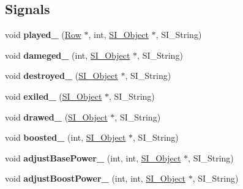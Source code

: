 \subsection*{Signals}
\begin{DoxyCompactItemize}
\item 
\mbox{\label{class_card_a9df468ae60047dea8dcf7a71fb4eb071}} 
void {\bfseries played\+\_\+} (\hyperlink{class_card_set}{Row} $\ast$, int, \hyperlink{class_s_i___object}{S\+I\+\_\+\+Object} $\ast$, S\+I\+\_\+\+String)
\item 
\mbox{\label{class_card_aa1882f8263bd74313148a0010206a36a}} 
void {\bfseries dameged\+\_\+} (int, \hyperlink{class_s_i___object}{S\+I\+\_\+\+Object} $\ast$, S\+I\+\_\+\+String)
\item 
\mbox{\label{class_card_adbf89377f717c353eb26e9a6fc9130e4}} 
void {\bfseries destroyed\+\_\+} (\hyperlink{class_s_i___object}{S\+I\+\_\+\+Object} $\ast$, S\+I\+\_\+\+String)
\item 
\mbox{\label{class_card_af74e10d19deffaedf6d40e916b38a601}} 
void {\bfseries exiled\+\_\+} (\hyperlink{class_s_i___object}{S\+I\+\_\+\+Object} $\ast$, S\+I\+\_\+\+String)
\item 
\mbox{\label{class_card_a0175ac76e02db0997d285212eeed3423}} 
void {\bfseries drawed\+\_\+} (\hyperlink{class_s_i___object}{S\+I\+\_\+\+Object} $\ast$, S\+I\+\_\+\+String)
\item 
\mbox{\label{class_card_afbafa9d69894f687ba7a2f7b0cd8a5dc}} 
void {\bfseries boosted\+\_\+} (int, \hyperlink{class_s_i___object}{S\+I\+\_\+\+Object} $\ast$, S\+I\+\_\+\+String)
\item 
\mbox{\label{class_card_ac38dfd022350292672a23f5dbe690a4c}} 
void {\bfseries adjust\+Base\+Power\+\_\+} (int, int, \hyperlink{class_s_i___object}{S\+I\+\_\+\+Object} $\ast$, S\+I\+\_\+\+String)
\item 
\mbox{\label{class_card_ac3b4d7d244400105782caea99940c4d8}} 
void {\bfseries adjust\+Boost\+Power\+\_\+} (int, int, \hyperlink{class_s_i___object}{S\+I\+\_\+\+Object} $\ast$, S\+I\+\_\+\+String)
\item 

\end{DoxyCompactItemize}
